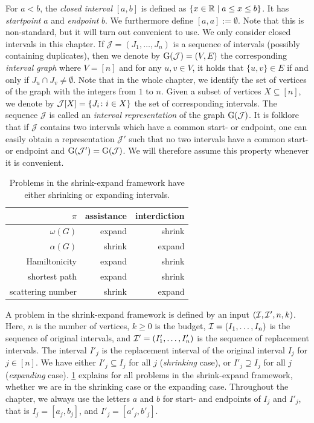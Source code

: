 For $a < b$, the \emph{closed interval} $[a, b]$ is defined as $\{ x \in \mathbb{R} \mid a \leq x \leq b \}$. It has \emph{startpoint} $a$ and \emph{endpoint} $b$. We furthermore define $[a, a] := \emptyset$. Note that this is non-standard, but it will turn out convenient to use. We only consider closed intervals in this chapter. If $\mathcal{J} =  (J_1, \dots, J_n)$ is a sequence of intervals (possibly containing duplicates), then we denote by $\operatorname{G}(\mathcal{J}) = (V,E)$ the corresponding \emph{interval graph}
where $V = [n]$ and for any $u,v \in V$, it holds that $\{u,v\} \in E$ if and only if 
$J_u \cap J_v \neq \emptyset$. Note that in the whole chapter, we identify the set of 
vertices of the graph with the integers from $1$ to $n$. Given a subset of vertices $X \subseteq [n]$, we denote by 
$\mathcal{J}[X] = \{ J_i \colon i \in X \}$ the set of corresponding intervals.
The sequence $\mathcal{J}$ is called an \emph{interval representation} of the graph $\operatorname{G}(\mathcal{J})$. It is folklore that if $\mathcal{J}$ contains two intervals which have a common start- or endpoint, one can easily obtain a representation $\mathcal{J}'$ such that no two intervals have a common start- or endpoint and $\operatorname{G}(\mathcal{J}') = \operatorname{G}(\mathcal{J})$. We will therefore assume this property whenever it is convenient.



\begin{table}
\centering
\begin{tabular}{r|rr}
$\pi$ & assistance & interdiction\\
\hline
$\omega(G)$ & expand & shrink\\
$\alpha(G)$ & shrink & expand \\
Hamiltonicity & expand & shrink \\
shortest path & expand & shrink \\
scattering number & shrink & expand
\end{tabular}
\caption{Problems in the shrink-expand framework have either shrinking or expanding intervals.}
\label{tab:shrink-expand-overview}
\end{table}
A problem in the shrink-expand framework is defined by an input $(\mathcal{I}, \mathcal{I}', n, k)$. Here, $n$ is the number of vertices, $k \geq 0$ is the budget, $\mathcal{I} = (I_1, \dots, I_n)$ is the sequence of original intervals, and $\mathcal{I}' = (I'_1, \dots, I'_n)$ is the sequence of replacement intervals. The interval $I'_j$ is the replacement interval of the original interval $I_j$ for $j \in [n]$.  We have either $I'_j \subseteq I_j$ for all $j$ (\emph{shrinking} case), or $I'_j \supseteq I_j$ for all $j$ (\emph{expanding} case). \cref{tab:shrink-expand-overview} explains for all problems in the shrink-expand framework, whether we are in the shrinking case or the expanding case. Throughout the chapter, we always use the letters $a$ and $b$ for start- and endpoints of $I_j$ and $I'_j$, that is $I_j = [a_j, b_j]$, and $I'_j = [a'_j, b'_j]$.


